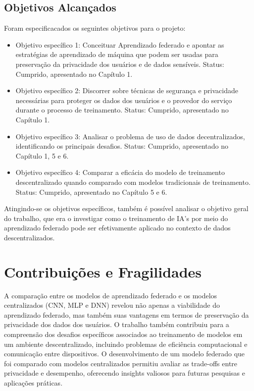 \subsection{Objetivos Alcançados}

Foram especificacados os seguintes objetivos para o projeto:

\begin{itemize}
    \item Objetivo específico 1: Conceituar Aprendizado federado e apontar as estratégias de aprendizado de máquina que podem ser usadas para preservação da privacidade dos usuários e de dados sensíveis. Status: Cumprido, apresentado no Capítulo 1.
    \item Objetivo específico 2: Discorrer sobre técnicas de segurança e privacidade necessárias para proteger os dados dos usuários e o provedor do serviço durante o processo de treinamento. Status: Cumprido, apresentado no Capítulo 1.
    \item Objetivo específico 3: Analisar o problema de uso de dados decentralizados, identificando os principais desafios. Status: Cumprido, apresentado no Capítulo 1, 5 e 6.
    \item Objetivo específico 4: Comparar a eficácia do modelo de treinamento descentralizado quando comparado com modelos tradicionais de treinamento. Status: Cumprido, apresentado no Capítulo 5 e 6.
\end{itemize}

Atingindo-se os objetivos específicos, também é possível analisar o objetivo geral do trabalho, que era o investigar como o treinamento de IA's por meio do aprendizado federado pode ser efetivamente aplicado no contexto de dados descentralizados.

\section{Contribuições e Fragilidades}
\label{sec:contribuicoes}

A comparação entre os modelos de aprendizado federado e os modelos centralizados (CNN, MLP e DNN) revelou não apenas a viabilidade do aprendizado federado, mas também suas vantagens em termos de preservação da privacidade dos dados dos usuários. O trabalho também contribuiu para a compreensão dos desafios específicos associados ao treinamento de modelos em um ambiente descentralizado, incluindo problemas de eficiência computacional e comunicação entre dispositivos. O desenvolvimento de um modelo federado que foi comparado com modelos centralizados permitiu avaliar as trade-offs entre privacidade e desempenho, oferecendo insights valiosos para futuras pesquisas e aplicações práticas.

